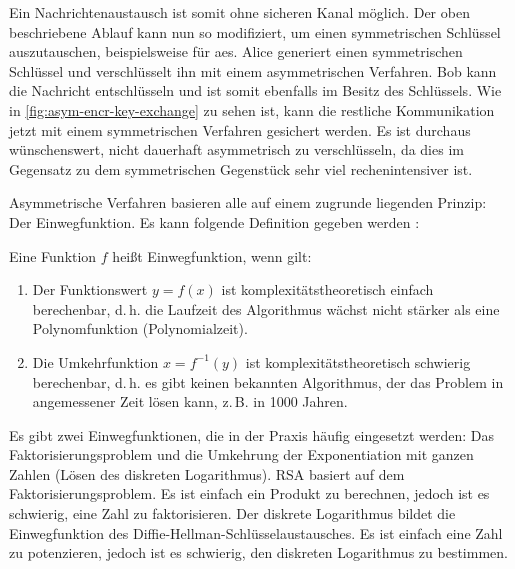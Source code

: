 

\noindent
Ein Nachrichtenaustausch ist somit ohne sicheren Kanal möglich. Der oben beschriebene
Ablauf kann nun so modifiziert, um einen symmetrischen Schlüssel auszutauschen, beispielsweise
für \acs{aes}. Alice generiert einen symmetrischen Schlüssel und verschlüsselt ihn mit einem
asymmetrischen Verfahren. Bob kann die Nachricht entschlüsseln und ist somit ebenfalls
im Besitz des Schlüssels. Wie in \autoref{fig:asym-encr-key-exchange} zu sehen ist,
kann die restliche Kommunikation jetzt mit einem symmetrischen
Verfahren gesichert werden. Es ist durchaus wünschenswert, nicht dauerhaft asymmetrisch
zu verschlüsseln, da dies im Gegensatz zu dem symmetrischen Gegenstück sehr viel
rechenintensiver ist.
\newpage



\noindent
Asymmetrische Verfahren basieren alle auf einem zugrunde liegenden Prinzip:
Der Einwegfunktion. Es kann folgende
Definition gegeben werden \parencite[153]{BOOK:crypto}:

\begin{definition}[Einwegfunktion]
  Eine Funktion $f$ heißt Einwegfunktion, wenn gilt:
  \begin{enumerate}
    \item Der Funktionswert $y = f(x)$ ist komplexitätstheoretisch einfach berechenbar,
          d.\,h. die Laufzeit des Algorithmus wächst
          nicht stärker als eine Polynomfunktion (Polynomialzeit).
    \item Die Umkehrfunktion $x = f^{-1}(y)$ ist komplexitätstheoretisch schwierig berechenbar,
          d.\,h. es gibt keinen bekannten Algorithmus, der das Problem in angemessener
          Zeit lösen kann, z.\,B. in 1000 Jahren.
  \end{enumerate}
\end{definition}

\noindent
Es gibt zwei Einwegfunktionen, die in der Praxis häufig eingesetzt werden:
Das Faktorisierungsproblem und die Umkehrung der Exponentiation mit ganzen Zahlen
(Lösen des diskreten Logarithmus).
RSA basiert auf dem Faktorisierungsproblem.
Es ist einfach ein Produkt zu berechnen, jedoch ist es schwierig, eine Zahl zu
faktorisieren.
Der diskrete Logarithmus bildet die Einwegfunktion des
Diffie-Hellman-Schlüsselaustausches.
Es ist einfach eine Zahl zu potenzieren, jedoch ist es schwierig,
den diskreten Logarithmus zu bestimmen.
\newpage

